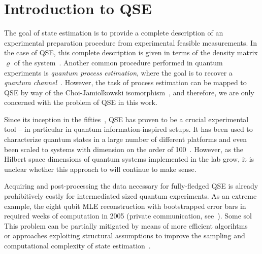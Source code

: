 \section{Introduction to QSE}
\label{sec:error.intro}


The goal of state estimation is to provide a complete description of an experimental preparation procedure from experimental feasible measurements.
In the case of QSE, this complete description is given in terms of the density matrix $\varrho$ of the system~\cite{Paris_2004_Quantum}.
Another common procedure performed in quantum experiments is \emph{quantum process estimation}, where the goal is to recover a \emph{quantum channel}~\cite{Nielsen_2010_Quantum}.
However, the task of process estimation can be mapped to QSE by way of the Choi-Jamiolkowski isomorphism~\cite{Nielsen_2010_Quantum,Jezek_2003_Quantum,Altepeter_2003_AncillaAssisted}, and therefore, we are only concerned with the problem of QSE in this work.

Since its inception in the fifties~\cite{Fano_1957_Description}, QSE has proven to be a crucial experimental tool -- in particular in quantum information-inspired setups.
It has been used to characterize quantum states in a large number of different platforms \cite{Brien_2004_Quantum,Lundeen_2009_Tomography,Terriza_2004_Triggered,Karpinski_2008_FiberOptic,Rippe_2008_Experimental,Steffen_2006_Measurement,Childress_2006_Coherent,Riebe_2007_Quantum,Schwemmer_2014_Experimental} and even been scaled to systems with dimension on the order of 100~\cite{Haeffner_2005_Scalable}.
However, as the Hilbert space dimensions of quantum systems implemented in the lab grow, it is unclear whether this approach to  will continue to make sense.

Acquiring and post-processing the data necessary for fully-fledged QSE is already prohibitively costly for intermediated sized quantum experiments.
As an extreme example, the eight qubit MLE reconstruction with bootstrapped error bars in~\cite{Haeffner_2005_Scalable} required weeks of computation in 2005 (private communication, see~\cite{Gross_2010_Quantum}).
Some sol
This problem can be partially mitigated by means of more efficient algorihtms~\cite{Smolin_2012_Maximum,Qi_2013_Quantum,Hou_2016_Full,Shang_2017_Superfast} or approaches exploiting structural assumptions to improve the sampling and computational complexity of state estimation~\cite{Cramer_2010_Efficient,Gross_2010_Quantum,Flammia_2012_Quantum,Schwemmer_2015_Systematic,Baumgratz_2013_Scalablea,Baumgratz_2013_Scalable}.

